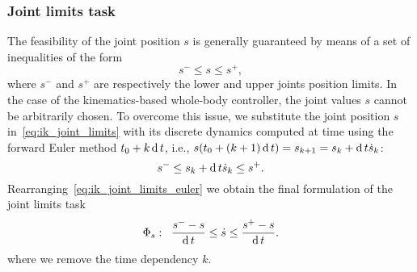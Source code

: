 \subsubsection{Joint limits task}
The feasibility of the joint position $s$ is generally guaranteed by means of a set of inequalities of the form 
\begin{equation}
\label{eq:ik_joint_limits}
    s^- \le s \le s^+,
\end{equation}
where $s^-$ and $s^+$ are respectively the lower and upper joints position limits. 
In the case of the kinematics-based whole-body controller, the joint values $s$ cannot be arbitrarily chosen. To overcome this issue, we substitute the joint position $s$ in~\eqref{eq:ik_joint_limits} with its discrete dynamics computed at time using the forward Euler method $t_0 + k \operatorname{d} t$, i.e., $s(t_0 + (k+1) \operatorname{d} t) = s_{k+1} = s_k + \operatorname{d} t \dot{s}_k$:
\begin{equation}
\label{eq:ik_joint_limits_euler}
    s^- \le  s_k + \operatorname{d} t \dot{s}_k \le s^+.
\end{equation}
Rearranging~\eqref{eq:ik_joint_limits_euler} we obtain the final formulation of the joint limits task
\begin{equation}
   \Phi_s :  \;\; \frac{s^-  -s}{\operatorname{d} t} \le   \dot{s} \le \frac{s^+  -s}{\operatorname{d} t}.
\end{equation}
where we remove the time dependency $k$.

